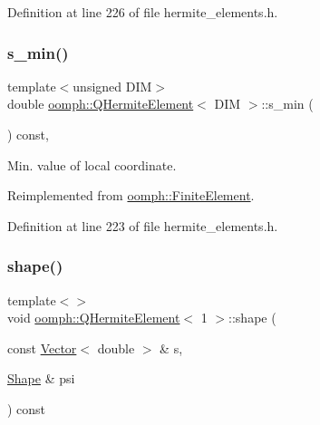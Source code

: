 Definition at line 226 of file hermite\+\_\+elements.\+h.

\mbox{\label{classoomph_1_1QHermiteElement_a913af787533d6c0fae4269c601ac62af}} 
\subsubsection{\texorpdfstring{s\+\_\+min()}{s\_min()}}
{\footnotesize\ttfamily template$<$unsigned D\+IM$>$ \\
double \hyperlink{classoomph_1_1QHermiteElement}{oomph\+::\+Q\+Hermite\+Element}$<$ D\+IM $>$\+::s\+\_\+min (\begin{DoxyParamCaption}{ }\end{DoxyParamCaption}) const\hspace{0.3cm}{\ttfamily [inline]}, {\ttfamily [virtual]}}



Min. value of local coordinate. 



Reimplemented from \hyperlink{classoomph_1_1FiniteElement_a35f0803115b68bd162c07de04eeb6c5c}{oomph\+::\+Finite\+Element}.



Definition at line 223 of file hermite\+\_\+elements.\+h.

\mbox{\label{classoomph_1_1QHermiteElement_a8c5693519e823d93b38c120e47e82330}} 
\subsubsection{\texorpdfstring{shape()}{shape()}\hspace{0.1cm}{\footnotesize\ttfamily [1/3]}}
{\footnotesize\ttfamily template$<$$>$ \\
void \hyperlink{classoomph_1_1QHermiteElement}{oomph\+::\+Q\+Hermite\+Element}$<$ 1 $>$\+::shape (\begin{DoxyParamCaption}\item[{const \hyperlink{classoomph_1_1Vector}{Vector}$<$ double $>$ \&}]{s,  }\item[{\hyperlink{classoomph_1_1Shape}{Shape} \&}]{psi }\end{DoxyParamCaption}) const\hspace{0.3cm}{\ttfamily [virtual]}}



